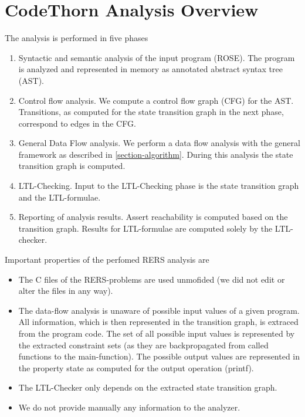 \section{CodeThorn Analysis Overview}

The analysis is performed in five phases

\begin{enumerate}
\item Syntactic and semantic analysis of the input program (ROSE). The program is analyzed and represented in memory as annotated abstract syntax tree (AST).
\item Control flow analysis. We compute a control flow graph (CFG) for the AST. Transitions, as computed for the state transition graph in the next phase, correspond to edges in the CFG.
\item General Data Flow analysis. We perform a data flow analysis with the general framework as described in \ref{section-algorithm}. During this analysis the state transition graph is computed.
\item LTL-Checking. Input to the LTL-Checking phase is the state transition graph and the LTL-formulae.
\item Reporting of analysis results. Assert reachability is computed based on the transition graph. Results for LTL-formulae are computed solely by the LTL-checker.
\end{enumerate}

Important properties of the perfomed RERS analysis are

\begin{itemize}
\item The C files of the RERS-problems are used unmofided (we did not edit or alter the files in any way). 
\item The data-flow analysis is unaware of possible input values of a
  given program. All information, which is then represented in the
  transition graph, is extraced from the program code. The set of all
  possible input values is represented by the extracted constraint
  sets (as they are backpropagated from called functions to the
  main-function). The possible output values are represented in the
  property state as computed for the output operation (printf).
\item The LTL-Checker only depends on the extracted state transition graph.
\item We do not provide manually any information to the analyzer.
\end{itemize}

